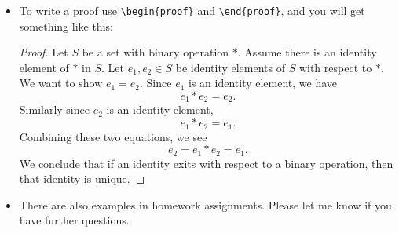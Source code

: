 \documentclass[12pt]{article}
\begin{document}
\begin{itemize}
\begin{enumerate}
		\end{enumerate}
	\item To write a proof use \verb|\begin{proof}| and \verb|\end{proof}|, and you will get something like this:
		\begin{proof}
			Let $S$ be a set with binary operation $*$. Assume there is an identity element of $*$ in $S$. Let $e_1,e_2\in S$ be identity elements of $S$ with respect to $*$. We want to show $e_1=e_2$. Since $e_1$ is an identity element, we have
				\[e_1*e_2 = e_2.\]
			Similarly since $e_2$ is an identity element,
				\[e_1*e_2 = e_1.\]
			Combining these two equations, we see
				\[e_2=e_1*e_2=e_1.\]
			We conclude that if an identity exits with respect to a binary operation, then that identity is unique.
		\end{proof}
	\item There are also examples in homework assignments. Please let me know if you have further questions.
\end{itemize}
\end{document}
